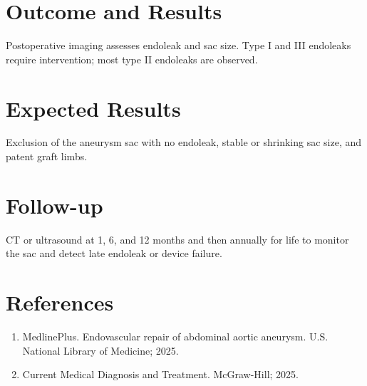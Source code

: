 \section*{Outcome and Results}
Postoperative imaging assesses endoleak and sac size. Type I and III endoleaks require intervention; most type II endoleaks are observed.

\section*{Expected Results}
Exclusion of the aneurysm sac with no endoleak, stable or shrinking sac size, and patent graft limbs.

\section*{Follow-up}
CT or ultrasound at 1, 6, and 12 months and then annually for life to monitor the sac and detect late endoleak or device failure.

\section*{References}
\begin{enumerate}
  \item MedlinePlus. Endovascular repair of abdominal aortic aneurysm. U.S. National Library of Medicine; 2025.
  \item Current Medical Diagnosis and Treatment. McGraw-Hill; 2025.
\end{enumerate}

\clearpage
